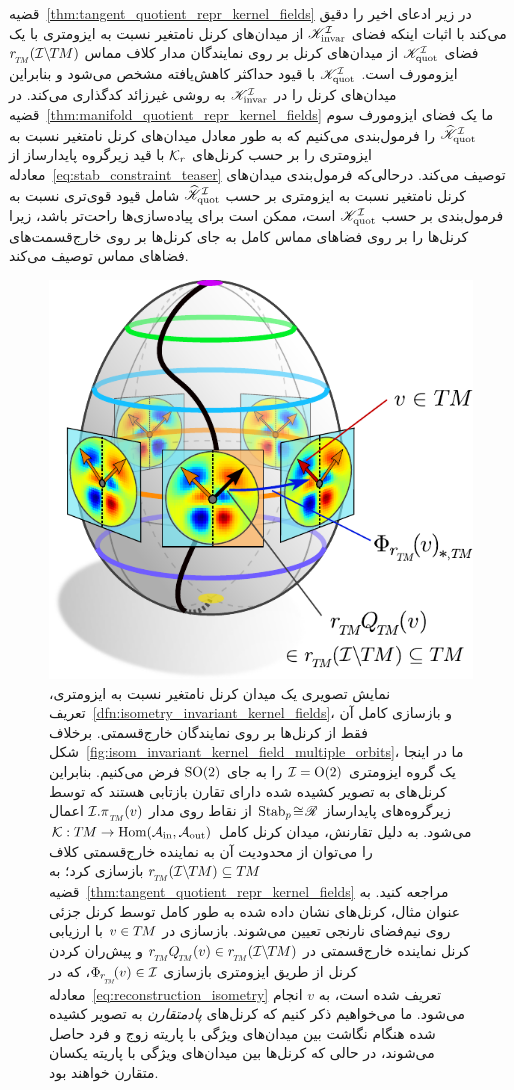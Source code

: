 قضیه~\ref{thm:tangent_quotient_repr_kernel_fields} در زیر ادعای اخیر را دقیق می‌کند با اثبات اینکه فضای $\mathscr{K}_\textup{invar}^{\mathcal{I}}$ از میدان‌های کرنل نامتغیر نسبت به ایزومتری با یک فضای $\mathscr{K}_\textup{quot}^{\mathcal{I}}$ از میدان‌های کرنل بر روی نمایندگان مدار کلاف مماس $\rTM(\ITM)$ ایزومورف است.
$\mathscr{K}_\textup{quot}^{\mathcal{I}}$ با قیود حداکثر کاهش‌یافته مشخص می‌شود و بنابراین میدان‌های کرنل را در $\mathscr{K}_\textup{invar}^{\mathcal{I}}$ به روشی غیرزائد کدگذاری می‌کند.
در قضیه~\ref{thm:manifold_quotient_repr_kernel_fields} ما یک فضای ایزومورف سوم $\KIquothat$ را فرمول‌بندی می‌کنیم که به طور معادل میدان‌های کرنل نامتغیر نسبت به ایزومتری را بر حسب کرنل‌های $\mathcal{K}_r$ با قید زیرگروه پایدارساز از معادله~\eqref{eq:stab_constraint_teaser} توصیف می‌کند.
درحالی‌که فرمول‌بندی میدان‌های کرنل نامتغیر نسبت به ایزومتری بر حسب $\KIquothat$ شامل قیود قوی‌تری نسبت به فرمول‌بندی بر حسب $\mathscr{K}_\textup{quot}^{\mathcal{I}}$ است، ممکن است برای پیاده‌سازی‌ها راحت‌تر باشد، زیرا کرنل‌ها را بر روی فضاهای مماس کامل به جای کرنل‌ها بر روی خارج‌قسمت‌های فضاهای مماس توصیف می‌کند.

\begin{figure}
    \centering
    \includegraphics[width=.51\columnwidth]{figures/isometry_egg_quotient_kernel.pdf}
    \captionsetup{width=1.\textwidth}
    \hfill
    \caption{\small
        نمایش تصویری یک میدان کرنل نامتغیر نسبت به ایزومتری، تعریف~\ref{dfn:isometry_invariant_kernel_fields}، و بازسازی کامل آن فقط از کرنل‌ها بر روی نمایندگان خارج‌قسمتی.
        برخلاف شکل~\ref{fig:isom_invariant_kernel_field_multiple_orbits}، ما در اینجا یک گروه ایزومتری $\mathcal{I} = \operatorname{O}(2)$ را به جای $\operatorname{SO}(2)$ فرض می‌کنیم.
        بنابراین کرنل‌های به تصویر کشیده شده دارای تقارن بازتابی هستند که توسط زیرگروه‌های پایدارساز $\operatorname{Stab}_{p} \!\cong\! \mathscr{R}$ از نقاط روی مدار $\I.\piTM(v)$ اعمال می‌شود.
        به دلیل تقارنش، میدان کرنل کامل $\mathcal{K}: T\mkern-1.5muM\to \operatorname{Hom}(\mathcal{A}_\textup{in},\mathcal{A}_\textup{out})$ را می‌توان از محدودیت آن به نماینده خارج‌قسمتی کلاف $\rTM(\ITM) \subseteq \TM$ بازسازی کرد؛ به قضیه~\ref{thm:tangent_quotient_repr_kernel_fields} مراجعه کنید.
        به عنوان مثال، کرنل‌های نشان داده شده به طور کامل توسط کرنل جزئی روی نیم‌فضای نارنجی تعیین می‌شوند.
        بازسازی در $v\in T\mkern-1.5muM$ با ارزیابی کرنل نماینده خارج‌قسمتی در $\rTM\QTM(v) \in \rTM(\ITM)$ و پیش‌ران کردن کرنل از طریق ایزومتری بازسازی $\PhirNoArg(v) \in \I$، که در معادله~\eqref{eq:reconstruction_isometry} تعریف شده است، به $v$ انجام می‌شود.
        ما می‌خواهیم ذکر کنیم که کرنل‌های \emph{پادمتقارن} به تصویر کشیده شده هنگام نگاشت بین میدان‌های ویژگی با پاریته زوج و فرد حاصل می‌شوند، در حالی که کرنل‌ها بین میدان‌های ویژگی با پاریته یکسان متقارن خواهند بود.
        }
    \label{fig:isom_invariant_kernel_field_quotient}
\end{figure}



